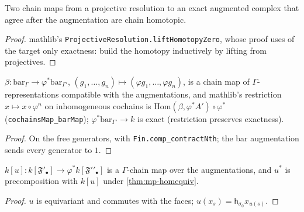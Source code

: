 \begin{theorem}\label{thm:mp-homotopy-exact}
  \leanok
  Two chain maps from a projective resolution to an exact augmented complex that agree after the augmentation are
  chain homotopic.
\end{theorem}
\begin{proof}
  \leanok
  mathlib's \texttt{ProjectiveResolution.liftHomotopyZero}, whose proof uses of the target only exactness: build the homotopy
  inductively by lifting from projectives.
\end{proof}

\begin{definition}\label{def:mp-barmap}
  \leanok
  $\beta\colon\mathrm{bar}_\Gamma\to\varphi^*\mathrm{bar}_{\Gamma'}$, $(g_1,\dots,g_n)\mapsto(\varphi g_1,\dots,\varphi g_n)$, is a chain map of
  $\Gamma$-representations compatible with the augmentations, and mathlib's restriction $x\mapsto x\circ\varphi^n$ on inhomogeneous
  cochains is $\mathrm{Hom}(\beta,\varphi^*A')\circ\varphi^*$ (\texttt{cochainsMap\_barMap}); $\varphi^*\mathrm{bar}_{\Gamma'}\to k$ is exact
  (restriction preserves exactness).
\end{definition}
\begin{proof}
  \leanok
  On the free generators, with \texttt{Fin.comp\_contractNth}; the bar augmentation sends every generator to $1$.
\end{proof}

\begin{definition}\label{def:mp-zu}
  \leanok
  $k[u]\colon k[\mathfrak F'_\bullet]\to\varphi^*k[\mathfrak F'{}'_\bullet]$ is a $\Gamma$-chain map over the augmentations, and $u^*$ is
  precomposition with $k[u]$ under \ref{thm:mp-homequiv}.
\end{definition}
\begin{proof}
  \leanok
  $u$ is equivariant and commutes with the faces; $u(x_s)=\mathsf h_{\sigma_0}x_{u(s)}$.
\end{proof}

